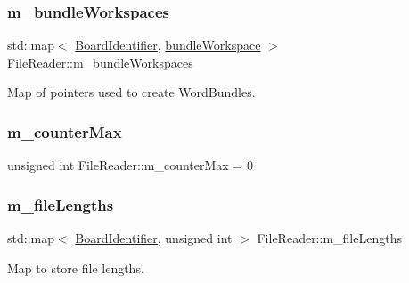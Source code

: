 \subsubsection{\texorpdfstring{m\+\_\+bundle\+Workspaces}{m\_bundleWorkspaces}}
{\footnotesize\ttfamily std\+::map$<$ \hyperlink{class_board_identifier}{Board\+Identifier}, \hyperlink{class_file_reader_a7fb625dc45cee3256d37cc19c65cad86}{bundle\+Workspace} $>$ File\+Reader\+::m\+\_\+bundle\+Workspaces\hspace{0.3cm}{\ttfamily [private]}}



Map of pointers used to create Word\+Bundles. 

\mbox{\label{class_file_reader_a7e3ce1501c6bd018d818aab3bfa18cdb}} 
\subsubsection{\texorpdfstring{m\+\_\+counter\+Max}{m\_counterMax}}
{\footnotesize\ttfamily unsigned int File\+Reader\+::m\+\_\+counter\+Max = 0\hspace{0.3cm}{\ttfamily [private]}}

\mbox{\label{class_file_reader_a983147c8929ee236bfde512c98e7e90d}} 
\subsubsection{\texorpdfstring{m\+\_\+file\+Lengths}{m\_fileLengths}}
{\footnotesize\ttfamily std\+::map$<$ \hyperlink{class_board_identifier}{Board\+Identifier}, unsigned int $>$ File\+Reader\+::m\+\_\+file\+Lengths\hspace{0.3cm}{\ttfamily [private]}}



Map to store file lengths. 

\mbox{\label{class_file_reader_a1b30d4ef75ca8de90c7271bc39ae320b}} 

